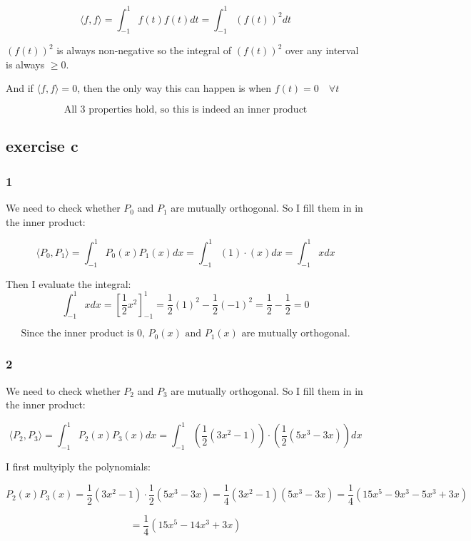 \documentclass[11pt, a4paper]{article}
\begin{document}
\[
\langle f, f \rangle = \int_{-1}^{1} f(t) f(t) dt = \int_{-1}^{1} {(f(t))}^2 dt
\]

${(f(t))}^2$ is always non-negative so the integral of ${(f(t))}^2$ over any interval is always $\geq 0$.

And if $\langle f, f \rangle = 0$, then the only way this can happen is when $f(t) = 0 \quad \forall t$ 


\[
\boxed{\text{All 3 properties hold, so this is indeed an inner product}}
\]

\subsection*{exercise c}
\subsubsection*{1}

We need to check whether $P_0$ and $P_1$ are mutually orthogonal. So I fill them in in the inner product:

\[
\langle P_0, P_1 \rangle = \int_{-1}^{1} P_0(x) P_1(x) dx = \int_{-1}^{1} (1) \cdot (x) dx = \int_{-1}^{1} x dx
\]

Then I evaluate the integral:
\[
\int_{-1}^{1} x dx = {\left[ \frac{1}{2} x^2 \right]}_{-1}^{1} = \frac{1}{2} {(1)}^2 - \frac{1}{2} {(-1)}^2 = \frac{1}{2} - \frac{1}{2} = 0
\]

\[\boxed{\text{Since the inner product is 0, $P_0(x)$ and $P_1(x)$ are mutually orthogonal.}}\]





\subsubsection*{2}

We need to check whether $P_2$ and $P_3$ are mutually orthogonal. So I fill them in in the inner product:

\[
\langle P_2, P_3 \rangle = \int_{-1}^{1} P_2(x) P_3(x) dx = \int_{-1}^{1} \left(\frac{1}{2} (3x^2 - 1)\right) \cdot \left(\frac{1}{2} (5x^3 - 3x)\right) dx
\]

I first multyiply the polynomials:

\[
P_2(x) P_3(x) = \frac{1}{2} (3x^2 - 1) \cdot \frac{1}{2} (5x^3 - 3x) = \frac{1}{4} (3x^2 - 1)(5x^3 - 3x) = \frac{1}{4} (15x^5 - 9x^3 - 5x^3 + 3x)
\]

\[
= \frac{1}{4} (15x^5 - 14x^3 + 3x) 
\]
\end{document}
